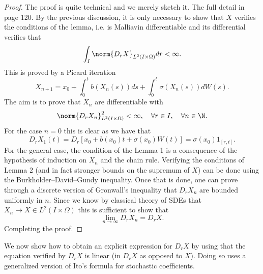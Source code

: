 \documentclass[
    a4paper,
    DIV=14,
    abstract=true,
    numbers=noenddot
]{scrartcl}
\begin{document}
\begin{proof}
	The proof is quite technical and we merely sketch it. The full detail in \cite{nunno2008malliavin} page 120.    By the previous discussion, it is only necessary to show that $X$ verifies the conditions of the lemma, i.e. is Malliavin differentiable and its differential verifies that
	\begin{equation*}
		\int_{I}\norm{D_rX}_{L^2(I\times\Omega)} d r<\infty.
	\end{equation*}
	This is proved by a Picard iteration
	\begin{equation*}
		X_{n+1}=x_0+\int_{0}^t b(X_n(s)) ds+\int_{0}^t\sigma (X_n(s)) dW(s).
	\end{equation*}
	The aim is to prove that $X_n$ are differentiable with
	\begin{equation*}
		\norm{D_rX_n}_{L^2(I\times\Omega)}^2<\infty , \quad\forall r\in I, \quad\forall n\in \N.
	\end{equation*}
	For the case $n=0$ this is clear as we have that
	\begin{equation*}
		D_rX_1(t)=D_r[x_0+b(x_0)t+\sigma (x_0) W(t)]=\sigma(x_0)1_{[r,t]}.
	\end{equation*}
	For the general case, the condition of the Lemma 1 is a consequence of the hypothesis of induction on $X_n$ and the chain rule.  Verifying the conditions of Lemma 2 (and in fact stronger bounds on the supremum of $X$) can be done using the Burkholder–David–Gundy inequality. Once that is done, one can prove through a discrete version of Gronwall's inequality that $D_rX_n$ are bounded uniformly in  $n$. Since we know by classical theory of SDEs that $X_n\to X\in L^2(I\times\Omega)$ this is sufficient to show that	\begin{equation*}
		\lim_{n \to \infty}D_rX_n=D_rX.
	\end{equation*}
	Completing the proof.
\end{proof}
We now show how to obtain an explicit expression for $D_rX$ by using that the equation verified by  $D_rX$ is linear (in  $D_rX$ as opposed to $X$). Doing so uses a generalized version of Ito's formula for stochastic coefficients.
\end{document}
